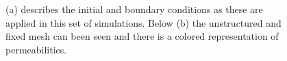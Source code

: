 \documentclass[preprint,authoryear,12pt]{elsarticle}
\begin{document}
\begin{figure}[h]
\begin{center}
\caption{(a) describes the initial and boundary conditions as these are applied in this set of simulations. Below (b) the unstructured and fixed mesh can been seen and there is a colored representation of permeabilities.}
\label{fig:testcase_heter_domain}
\end{center}
\end{figure}
\end{document}
